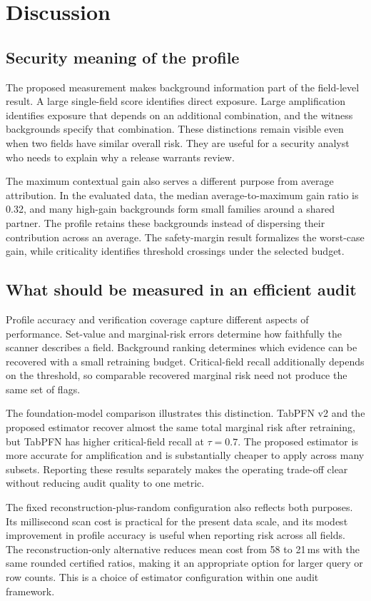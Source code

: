 \section{Discussion}\label{sec:discussion}
\subsection{Security meaning of the profile}
The proposed measurement makes background information part of the field-level result. A large single-field score identifies direct exposure. Large amplification identifies exposure that depends on an additional combination, and the witness backgrounds specify that combination. These distinctions remain visible even when two fields have similar overall risk. They are useful for a security analyst who needs to explain why a release warrants review.

The maximum contextual gain also serves a different purpose from average attribution. In the evaluated data, the median average-to-maximum gain ratio is 0.32, and many high-gain backgrounds form small families around a shared partner. The profile retains these backgrounds instead of dispersing their contribution across an average. The safety-margin result formalizes the worst-case gain, while criticality identifies threshold crossings under the selected budget.

\subsection{What should be measured in an efficient audit}
Profile accuracy and verification coverage capture different aspects of performance. Set-value and marginal-risk errors determine how faithfully the scanner describes a field. Background ranking determines which evidence can be recovered with a small retraining budget. Critical-field recall additionally depends on the threshold, so comparable recovered marginal risk need not produce the same set of flags.

The foundation-model comparison illustrates this distinction. TabPFN v2 and the proposed estimator recover almost the same total marginal risk after retraining, but TabPFN has higher critical-field recall at $\tau=0.7$. The proposed estimator is more accurate for amplification and is substantially cheaper to apply across many subsets. Reporting these results separately makes the operating trade-off clear without reducing audit quality to one metric.

The fixed reconstruction-plus-random configuration also reflects both purposes. Its millisecond scan cost is practical for the present data scale, and its modest improvement in profile accuracy is useful when reporting risk across all fields. The reconstruction-only alternative reduces mean cost from 58 to 21\,ms with the same rounded certified ratios, making it an appropriate option for larger query or row counts. This is a choice of estimator configuration within one audit framework.

